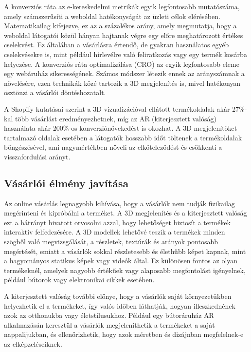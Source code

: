 \documentclass[12pt]{report}
\begin{document}
        A konverziós ráta az e-kereskedelmi metrikák egyik legfontosabb mutatószáma, amely számszerűsíti a weboldal hatékonyságát az üzleti célok elérésében. Matematikailag kifejezve, ez az a százalékos arány, amely megmutatja, hogy a weboldal látogatói közül hányan hajtanak végre egy előre meghatározott értékes cselekvést. Ez általában a vásárlásra értendő, de gyakran használatos egyéb cselekvésekre is, mint például hírlevélre való feliratkozás vagy egy termék kosárba helyezése. A konverziós ráta optimalizálása (CRO) az egyik legfontosabb eleme egy webáruház sikerességének. Számos módszer létezik ennek az arányszámnak a növelésére, ezen technikák közé tartozik a 3D megjelenítés is, mivel hatékonyan ösztönzi a vásárlói döntéshozatalt. 

        A Shopify kutatásai szerint a 3D vizualizációval ellátott termékoldalak akár 27\%-kal több vásárlást eredményezhetnek, míg az AR (kiterjesztett valóság) használata akár 200\%-os konverziónövekedést is okozhat. A 3D megjelenítőket tartalmazó oldalak esetében a látogatók hosszabb időt töltenek a termékoldalak böngészésével, ami nagymértékben növeli az elköteleződést és csökkenti a visszafordulási arányt. 
        
        \subsection{Vásárlói élmény javítása}

        Az online vásárlás legnagyobb kihívása, hogy a vásárlók nem tudják fizikailag megérinteni és kipróbálni a terméket. A 3D megjelenítés és a kiterjesztett valóság ezt a hátrányt hivatott orvosolni azzal, hogy lehetőséget biztosít a termékek interaktív felfedezésére. A 3D modellek lehetővé teszik a termékek minden szögből való megvizsgálását, a részletek, textúrák és arányok pontosabb megértését, emiatt a vásárlók sokkal részletesebb és élethűbb képet kapnak, mint a hagyományos statikus képek vagy videók által. Ez különösen fontos az olyan termékeknél, amelyek nagyobb értékűek vagy alaposabb megfontolást igényelnek, például bútorok vagy elektronikai cikkek esetében.

        A kiterjesztett valóság további előnye, hogy a vásárlók saját környezetükben helyezhetik el a termékeket, így valós időben láthatják, hogyan illeszkednének azok az otthonukba vagy életstílusukhoz. Például egy bútoráruház AR alkalmazásán keresztül a vásárlók megjeleníthetik a termékeket a saját nappalijukban, és ellenőrizhetik, hogy azok méretben és dizájnban megfelelnek-e az elképzeléseiknek.
        
\end{document}
